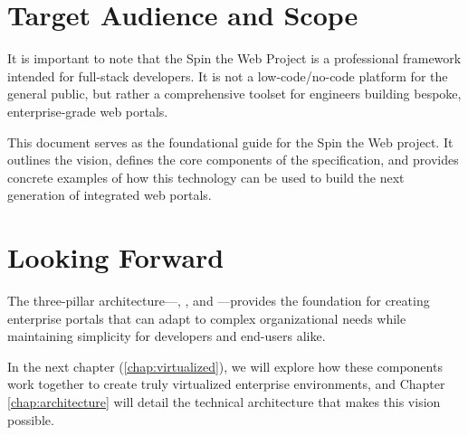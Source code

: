 \section{Target Audience and Scope}
\label{sec:target-audience}

It is important to note that the Spin the Web Project is a professional framework intended for full-stack developers. It is not a low-code/no-code platform for the general public, but rather a comprehensive toolset for engineers building bespoke, enterprise-grade web portals.

This document serves as the foundational guide for the Spin the Web project. It outlines the vision, defines the core components of the \wbdl{} specification, and provides concrete examples of how this technology can be used to build the next generation of integrated web portals.

\section{Looking Forward}
\label{sec:looking-forward}

The three-pillar architecture—\wbdl{}, \webspinner{}, and \studio{}—provides the foundation for creating enterprise portals that can adapt to complex organizational needs while maintaining simplicity for developers and end-users alike.

In the next chapter (\cref{chap:virtualized}), we will explore how these components work together to create truly virtualized enterprise environments, and Chapter \ref{chap:architecture} will detail the technical architecture that makes this vision possible.
